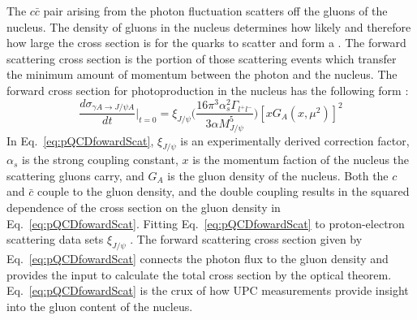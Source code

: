     The $c\bar{c}$ pair arising from the photon fluctuation scatters off the 
      gluons of the nucleus. 
    The density of gluons in the nucleus determines how likely and therefore 
      how large the cross section is for the quarks to scatter and form a 
      \JPsi{}.
    The forward scattering cross section is the portion of those scattering 
      events which transfer the minimum amount of momentum between the 
      photon and the nucleus. 
    The forward cross section for \JPsi{} photoproduction in the nucleus has 
      the following form \cite{pQCD2011.08}:
    \begin{equation} \label{eq:pQCDfowardScat}
      \frac{d\sigma_{\gamma A\rightarrow J/\psi A}}{dt}\Big|_{t=0}=\xi_{J/\psi}
        \Big(\frac{16\pi^{3}\alpha_{s}^{2}\Gamma_{l^{+}l^{-}}}{3\alpha 
        M_{J/\psi}^{5}}\Big)[xG_{A}(x,\mu^{2})]^{2}
    \end{equation}
    In Eq.~\ref{eq:pQCDfowardScat}, $\xi_{J/\psi}$ is an experimentally derived 
      correction factor, $\alpha_{s}$ is the strong coupling constant, $x$ is 
      the momentum faction of the nucleus the scattering gluons carry, and 
      $G_{A}$ is the gluon density of the nucleus. 
    Both the $c$ and $\bar{c}$ couple to the gluon density, and the double 
      coupling results in the squared dependence of the cross section on the 
      gluon density in Eq.~\ref{eq:pQCDfowardScat}. 
    Fitting Eq.~\ref{eq:pQCDfowardScat} to proton-electron scattering data 
      sets $\xi_{J/\psi}$ \cite{pQCD2011.08}.
    The forward scattering cross section given by Eq.~\ref{eq:pQCDfowardScat} 
      connects the photon flux to the gluon density and provides the input to 
      calculate the total cross section by the optical theorem. 
    Eq.~\ref{eq:pQCDfowardScat} is the crux of how UPC measurements provide
      insight into the gluon content of the nucleus.
    
